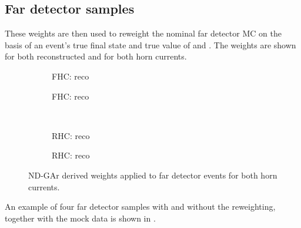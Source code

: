 \subsection{Far detector samples}

These weights are then used to reweight the nominal far detector MC on the basis of an event's true final state and true value of \evis and \pvis.
The weights are shown for both reconstructed \numu and \nue for both horn currents.

\begin{figure}[h]
	\begin{subfigure}[t]{.5\linewidth}
		\begin{adjustbox}{max totalsize=\linewidth, center}
			
		\end{adjustbox}
		\caption{FHC: reco \numu}
	\end{subfigure}
	\hfill
	\begin{subfigure}[t]{.5\linewidth}
		\begin{adjustbox}{max totalsize=\linewidth, center}
			
		\end{adjustbox}
		\caption{FHC: reco \nue}
	\end{subfigure}	\\
	\begin{subfigure}[t]{.5\linewidth}
		\begin{adjustbox}{max totalsize=\linewidth, center}
			
		\end{adjustbox}
		\caption{RHC: reco \numu}
	\end{subfigure}
	\hfill
	\begin{subfigure}[t]{.5\linewidth}
		\begin{adjustbox}{max totalsize=\linewidth, center}
			
		\end{adjustbox}
		\caption{RHC: reco \nue}
	\end{subfigure}
	\caption[ND-GAr derived weights applied to far detector events]{ND-GAr derived weights applied to far detector events for both horn currents.}
\end{figure}

An example of four far detector samples with and without the reweighting, together with the mock data is shown in .
